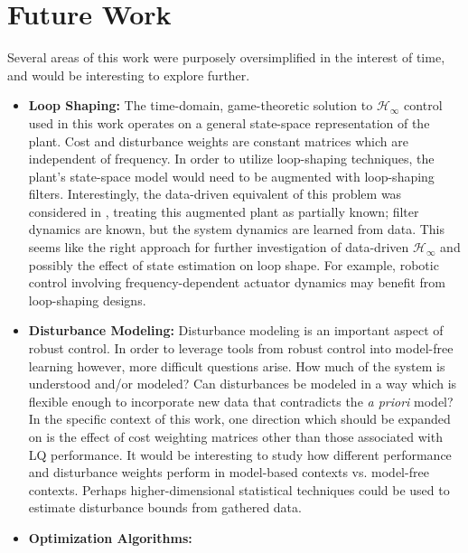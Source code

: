 \section{Future Work}
Several areas of this work were purposely oversimplified in the interest of time, and would be interesting to explore further.
\begin{itemize}
\item{\textbf{Loop Shaping:} The time-domain, game-theoretic solution to $\mathcal{H}_{\infty}$ control used in this work operates on a general state-space representation of the plant.  Cost and disturbance weights are constant matrices which are independent of frequency.  In order to utilize loop-shaping techniques, the plant's state-space model would need to be augmented with loop-shaping filters.  Interestingly, the data-driven equivalent of this problem was considered in \cite{berberich2022combining}, treating this augmented plant as partially known; filter dynamics are known, but the system dynamics are learned from data.  This seems like the right approach for further investigation of data-driven $\mathcal{H}_{\infty}$ and possibly the effect of state estimation on loop shape.  For example, robotic control involving frequency-dependent actuator dynamics may benefit from loop-shaping designs.
}
%
\item{\textbf{Disturbance Modeling:}
Disturbance modeling is an important aspect of robust control.  In order to leverage tools from robust control into model-free learning however, more difficult questions arise.  How much of the system is understood and/or modeled?  Can disturbances be modeled in a way which is flexible enough to incorporate new data that contradicts the \emph{a priori} model?  In the specific context of this work, one direction which should be expanded on is the effect of cost weighting matrices other than those associated with LQ performance.  It would be interesting to study how different performance and disturbance weights perform in model-based contexts vs. model-free contexts.  Perhaps higher-dimensional statistical techniques could be used to estimate disturbance bounds from gathered data.
}
%
\item{\textbf{Optimization Algorithms:}
}
\end{itemize}
